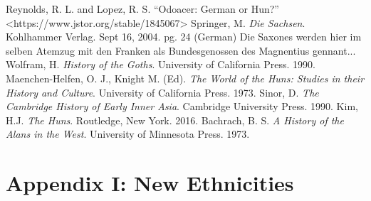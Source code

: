 \documentclass{article}
\newcommand{\specificCite}[1]{\tiny #1 \normalsize}
\begin{document}
\begin{thebibliography}{99}
		Reynolds, R. L. and Lopez, R. S. “Odoacer: German or Hun?” <https://www.jstor.org/stable/1845067>
		Springer, M. \textit{Die Sachsen}. Kohlhammer Verlag. Sept 16, 2004. pg. 24 (German)
		\newline\specificCite{Die Saxones werden hier im selben Atemzug mit den Franken als Bundesgenossen des Magnentius gennant...}
		Wolfram, H. \textit{History of the Goths}. University of California Press. 1990.
		Maenchen-Helfen, O. J., Knight M. (Ed). \textit{The World of the Huns: Studies in their History and Culture}. University of California Press. 1973.
		Sinor, D. \textit{The Cambridge History of Early Inner Asia}. Cambridge University Press. 1990.
		Kim, H.J. \textit{The Huns}. Routledge, New York. 2016.
		Bachrach, B. S. \textit{A History of the Alans in the West}. University of Minnesota Press. 1973.
	\end{thebibliography}
	
	\newpage
	
	\section{Appendix I: New Ethnicities}
	\label{sec:appendix_new_ethnicities}
	
\end{document}
